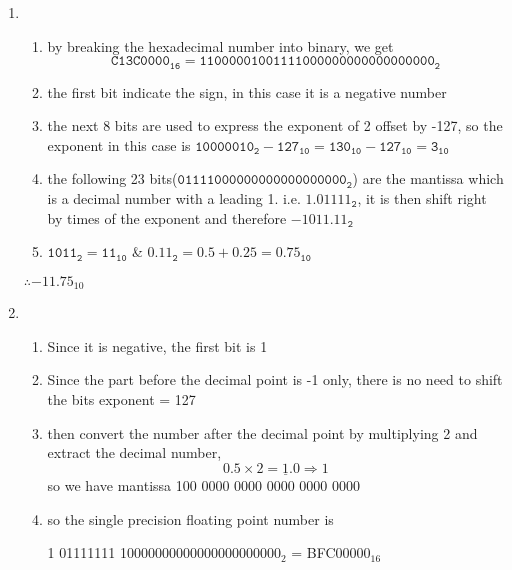 \documentclass[12pt, a4paper]{article}
\begin{document}
\begin{ans}
    \begin{enumerate}
        \item \begin{enumerate}
                \item by breaking the hexadecimal number into binary, we get $$\mathtt{C13C0000_{16}}=\mathtt{1100 0001 0011 1100 0000 0000 0000 0000_2}$$
                \item the first bit indicate the sign, in this case it is a negative number
                \item the next 8 bits are used to express the exponent of 2 offset by -127, so the exponent in this case is $\mathtt{10000010_2 - 127_{10} = 130_{10} - 127_{10} = 3_{10}}$ 
                \item the following 23 bits($\mathtt{011 1100 0000 0000 0000 0000_2}$) are the mantissa which is a decimal number with a leading 1. i.e. $\mathtt{1.01111_2}$, it is then shift right by times of the exponent and therefore $\mathtt{-1011.11_2}$
                \item $\mathtt{1011_2 = 11_{10}}$ \& $\mathtt{0.11_2 = 0.5 + 0.25 = 0.75_{10}}$ 
            \end{enumerate}
            \begin{center}
                $\therefore-11.75_{10}$
            \end{center}
        \item \begin{enumerate}
                \item Since it is negative, the first bit is 1
                \item Since the part before the decimal point is -1 only, there is no need to shift the bits exponent = 127
                \item then convert the number after the decimal point by multiplying 2 and extract the decimal number, 
                        $$0.5 \times 2 = \underline{1}.0 \Rightarrow 1$$
                    so we have mantissa 100 0000 0000 0000 0000 0000
                \item so the single precision floating point number is
                    \begin{center}
                        1 01111111 10000000000000000000000$_2$ = BFC00000$_{16}$
                    \end{center}
            \end{enumerate}
    \end{enumerate}
\end{ans}
\end{document}
